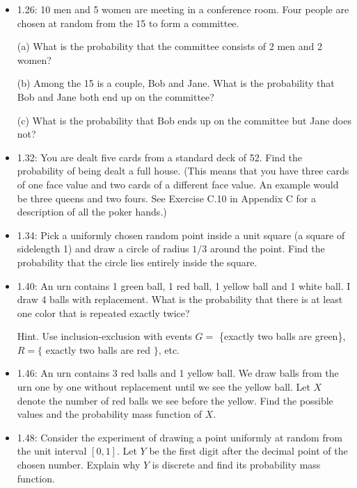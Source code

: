 \documentclass[10pt]{article}
\begin{document}
\begin{itemize}
(b) Give an example of an event in this probability space with probability $\frac{3}{52}$.

(c) Show that there is no event in this probability space with probability $\frac{1}{5}$.

\hfill \break
\item 1.26: 10 men and 5 women are meeting in a conference room. Four people are chosen at random from the 15 to form a committee.

(a) What is the probability that the committee consists of 2 men and 2 women?

(b) Among the 15 is a couple, Bob and Jane. What is the probability that Bob and Jane both end up on the committee?

(c) What is the probability that Bob ends up on the committee but Jane does not?

\hfill \break
\item 1.32: You are dealt five cards from a standard deck of 52. Find the probability of being dealt a full house. (This means that you have three cards of one face value and two cards of a different face value. An example would be three queens and two fours. See Exercise C.10 in Appendix C for a description of all the poker hands.)

\hfill \break
\item 1.34: Pick a uniformly chosen random point inside a unit square (a square of sidelength 1) and draw a circle of radius $1 / 3$ around the point. Find the probability that the circle lies entirely inside the square.

\hfill \break
\item 1.40: An urn contains 1 green ball, 1 red ball, 1 yellow ball and 1 white ball. I draw 4 balls with replacement. What is the probability that there is at least one color that is repeated exactly twice?

Hint. Use inclusion-exclusion with events $G=$ \{exactly two balls are green\}, $R=\{$ exactly two balls are red $\}$, etc.

\hfill \break
\item 1.46: An urn contains 3 red balls and 1 yellow ball. We draw balls from the urn one by one without replacement until we see the yellow ball. Let $X$ denote the number of red balls we see before the yellow. Find the possible values and the probability mass function of $X$.

\hfill \break
\item 1.48: Consider the experiment of drawing a point uniformly at random from the unit interval $[0,1]$. Let $Y$ be the first digit after the decimal point of the chosen number. Explain why $Y$ is discrete and find its probability mass function.

\end{itemize}
\end{document}
